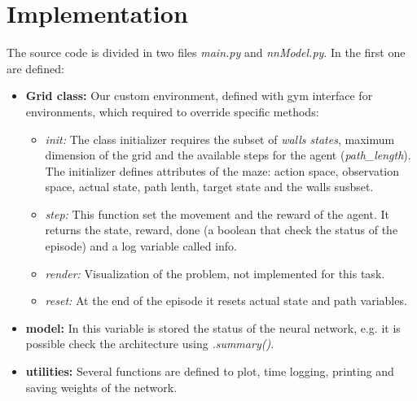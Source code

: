 \section{Implementation}
The source code is divided in two files \textit{main.py} and \textit{nnModel.py}.
In the first one are defined:
\begin{itemize}
    \item \textbf{Grid class: }Our custom environment, defined with gym interface for environments, which required to override specific methods: 
    \begin{itemize}
        \item \textit{init: }The class initializer requires the subset of \textit{walls states}, maximum dimension of the grid and the available steps for the agent (\textit{path\_length}). 
        The initializer defines attributes of the maze: action space, observation space, actual state, path lenth, target state and the walls susbset.
        \item \textit{step: }This function set the movement and the reward of the agent. It returns the state, reward, done (a boolean that check the status of the episode) and a log variable called info.
        \item \textit{render: }Visualization of the problem, not implemented for this task.
        \item \textit{reset: }At the end of the episode it resets actual state and path variables.
        \end{itemize}
    \item \textbf{model: }In this variable is stored the status of the neural network, e.g. it is possible check the architecture using\textit{ .summary()}. 
    \item \textbf{utilities: }Several functions are defined to plot, time logging, printing and saving weights of the network.

\end{itemize}

